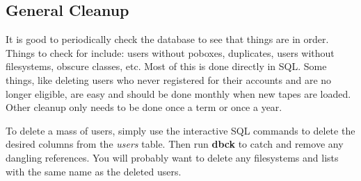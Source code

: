 \documentclass{book}
\begin{document}
\subsection{General Cleanup}

It is good to periodically check the database to see that things are
in order.  Things to check for include: users without poboxes,
duplicates, users without filesystems, obscure classes, etc.  Most of
this is done directly in SQL.  Some things, like deleting users who
never registered for their accounts and are no longer eligible, are
easy and should be done monthly when new tapes are loaded.  Other
cleanup only needs to be done once a term or once a year.

\label{deletingusers}
To delete a mass of users, simply use the interactive SQL commands to
delete the desired columns from the {\em users} table.  Then run
{\bf dbck} to catch and remove any dangling references.  You will
probably want to delete any filesystems and lists with the same name
as the deleted users.
\end{document}

